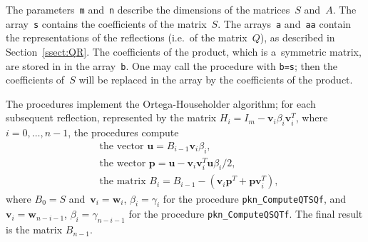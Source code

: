 The parameters~\texttt{m} and~\texttt{n} describe the dimensions of the
matrices~$S$ and~$A$.
The array~\texttt{s} contains the coefficients of the matrix~$S$. The
arrays~\texttt{a} and~\texttt{aa} contain the representations of the
reflections (i.e.\ of the matrix~$Q$), as described in Section~\ref{ssect:QR}.
The coefficients of the product, which is a~symmetric matrix, are
stored in in the array~\texttt{b}.
One may call the procedure with \texttt{b=s}; then the coefficients of~$S$
will be replaced in the array by the coefficients of the product.

The procedures implement the Ortega-Householder algorithm;
for each subsequent reflection, represented by the matrix
$H_i=I_m-\bm{v}_i\beta_i\bm{v}_i^T$, where $i=0,\ldots,n-1$, the procedures
compute
\begin{align*}
  &\mbox{the vector } \bm{u} = B_{i-1}\bm{v}_i\beta_i, \\
  &\mbox{the wector } \bm{p} = \bm{u}-\bm{v}_i\bm{v}_i^T\bm{u}\beta_i/2, \\
  &\mbox{the matrix } B_i = B_{i-1} - (\bm{v}_i\bm{p}^T+\bm{p}\bm{v}_i^T),
\end{align*}
where $B_0=S$ and~$\bm{v}_i=\bm{w}_i$, $\beta_i=\gamma_i$
for the procedure \texttt{pkn\_ComputeQTSQf}, and
$\bm{v}_i=\bm{w}_{n-i-1}$, $\beta_i=\gamma_{n-i-1}$ for the procedure
\texttt{pkn\_ComputeQSQTf}. The final result is the matrix $B_{n-1}$.

